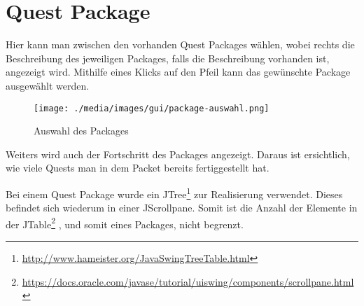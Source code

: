 \section{Quest Package}
Hier kann man zwischen den vorhanden Quest Packages wählen, wobei rechts die Beschreibung des jeweiligen Packages, falls die Beschreibung vorhanden ist, angezeigt wird. Mithilfe eines Klicks auf den Pfeil kann das gewünschte Package ausgewählt werden.

\begin{figure}[h] 
  \centering
     \texttt{[image: ./media/images/gui/package-auswahl.png]}
  \caption{Auswahl des Packages}
  \label{fig:Package_Auswahl}
\end{figure}

Weiters wird auch der Fortschritt des Packages angezeigt. Daraus ist ersichtlich, wie viele Quests man in dem Packet bereits fertiggestellt hat.

Bei einem Quest Package wurde ein JTree\footnote{\url{http://www.hameister.org/JavaSwingTreeTable.html}}  zur Realisierung verwendet. Dieses befindet sich wiederum in einer JScrollpane. Somit ist die Anzahl der Elemente in der JTable\footnote{\url{https://docs.oracle.com/javase/tutorial/uiswing/components/scrollpane.html}}  , und somit eines Packages, nicht begrenzt.
